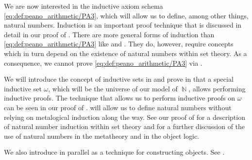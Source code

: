 \begin{remark}\label{rem:inductive_sets}
  We are now interested in the inductive axiom schema \eqref{eq:def:peano_arithmetic/PA3}, which will allow us to define, among other things, natural numbers. Induction is an important proof technique that is discussed in detail in our proof of . There are more general forms of induction than \eqref{eq:def:peano_arithmetic/PA3} like  and . They do, however, require concepts which in turn depend on the existence of natural numbers within set theory. As a consequence, we cannot prove \eqref{eq:def:peano_arithmetic/PA3} via .

  We will introduce the concept of inductive sets in  and prove in  that a special inductive set \hyperref[thm:smallest_inductive_set_existence]{\( \omega \)}, which will be the universe of our model of \( \BbbN \), allows performing inductive proofs. The technique that allows us to perform inductive proofs on \( \omega \) can be seen in our proof of .  will allow us to define natural numbers without relying on metalogical induction along the way. See our proof of  for a description of natural number induction within set theory and  for a further discussion of the use of natural numbers in the metatheory and in the object logic.

  We also introduce  in parallel as a technique for constructing objects. See .
\end{remark}

